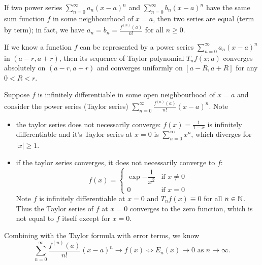     \begin{theoremenv}
        If two power series $\displaystyle \sum_{n=0}^\infty a_n (x-a)^n$ and $\displaystyle \sum_{n=0}^\infty b_n (x-a)^n$ have the same sum function $f$ in some neighbourhood of $x=a$, then two series are equal (term by term); in fact, we have $a_n = b_n= \displaystyle \frac{f^{(n)}(a)}{n!}$ for all $n\ge 0$.
    \end{theoremenv}
    \begin{propositionenv}
        If we know a function $f$ can be represented by a power series $\displaystyle \sum_{n=0}^\infty a_n (x-a)^n$ in $(a-r,a+r)$, then its sequence of Taylor polynomial $T_n f(x;a)$ converges absolutely on $(a-r,a+r)$ and converges uniformly on $[a-R,a+R]$ for any $0<R<r$.
    \end{propositionenv}
    \begin{remarkenv}
        Suppose $f$ is infinitely differentiable in some open neighbourhood of $x=a$ and consider the power series (Taylor series) $\displaystyle \sum_{n=0}^\infty \frac{f^{(n)}(a)}{n!} (x-a)^n$. Note
        \begin{itemize}
            \item the taylor series does not necessarily converge:
            $\displaystyle
            f(x) = \frac1{1-x}  
            $ is infinitely differentiable and it's Taylor series at $x=0$ is $\displaystyle \sum_{n=0}^\infty x^n$, which diverges for $|x|\ge 1$.

            \item if the taylor series converges, it does not necessarily converge to $f$:
            $$
            f(x) = \begin{cases}
            \exp{-\dfrac{1}{x^2}} & \text{if } x\neq 0\\[6pt]
            0 & \text{if } x=0
            \end{cases}
            $$Note $f$ is infinitely differentiable at $x=0$ and $T_n f(x)\equiv 0$ for all $n\in \mathbb{N}$. Thus the Taylor series of $f$ at $x=0$ converges to the zero function, which is not equal to $f$ itself except for $x=0$.
        \end{itemize}
        Combining with the Taylor formula with error terms, we know
        $$ \sum_{n=0}^\infty \frac{f^{(n)}(a)}{n!} (x-a)^n \to f(x) \Leftrightarrow E_n(x) \to 0 \text{ as } n\to \infty. $$
    \end{remarkenv}
    
